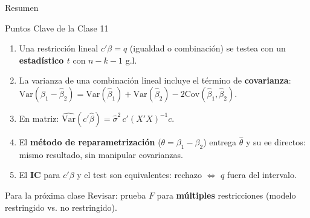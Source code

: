 \documentclass{beamer}
\begin{document}
\begin{frame}{Resumen}

\begin{block}{Puntos Clave de la Clase 11}
\begin{enumerate}
    \item Una restricción lineal $c'\beta=q$ (igualdad o combinación) se testea con un \textbf{estadístico $t$} con $n-k-1$ g.l.
    \item La varianza de una combinación lineal incluye el término de \textbf{covarianza}: $\text{Var}(\hat{\beta}_1-\hat{\beta}_2)=\text{Var}(\hat{\beta}_1)+\text{Var}(\hat{\beta}_2)-2\text{Cov}(\hat{\beta}_1,\hat{\beta}_2)$.
    \item En matriz: $\hat{\text{Var}}(c'\hat{\beta})=\hat{\sigma}^2\,c'(X'X)^{-1}c$.
    \item El \textbf{método de reparametrización} ($\theta=\beta_1-\beta_2$) entrega $\hat{\theta}$ y su ee directos: mismo resultado, sin manipular covarianzas.
    \item El \textbf{IC} para $c'\beta$ y el test son equivalentes: rechazo $\Leftrightarrow$ $q$ fuera del intervalo.
\end{enumerate}
\end{block}

\begin{alertblock}{Para la próxima clase}
Revisar: prueba $F$ para \textbf{múltiples} restricciones (modelo restringido vs. no restringido).
\end{alertblock}

\end{frame}
\end{document}
